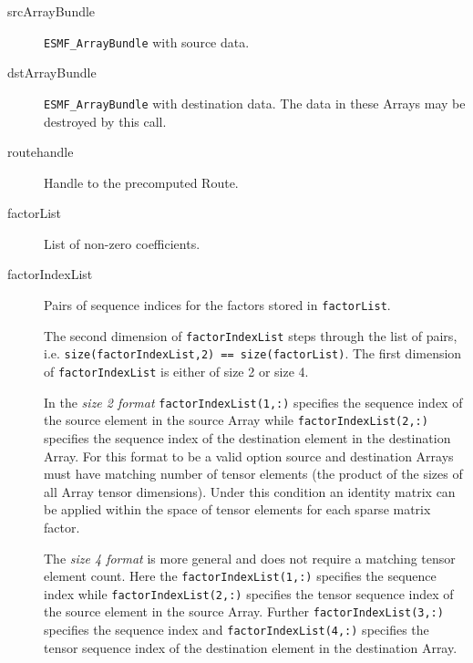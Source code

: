      \begin{description}
     \item [srcArrayBundle]
       {\tt ESMF\_ArrayBundle} with source data.
     \item [dstArrayBundle]
       {\tt ESMF\_ArrayBundle} with destination data. The data in these Arrays
       may be destroyed by this call.
     \item [routehandle]
       Handle to the precomputed Route.
     \item [factorList]
       List of non-zero coefficients.
     \item [factorIndexList]
       Pairs of sequence indices for the factors stored in {\tt factorList}.
  
       \begin{sloppypar}
       The second dimension of {\tt factorIndexList} steps through the list of
       pairs, i.e. {\tt size(factorIndexList,2) == size(factorList)}. The first
       dimension of {\tt factorIndexList} is either of size 2 or size 4.
       \end{sloppypar}
  
       In the {\em size 2 format} {\tt factorIndexList(1,:)} specifies the
       sequence index of the source element in the source Array while
       {\tt factorIndexList(2,:)} specifies the sequence index of the
       destination element in the destination Array. For this format to be a
       valid option source and destination Arrays must have matching number of
       tensor elements (the product of the sizes of all Array tensor dimensions).
       Under this condition an identity matrix can be applied within the space of
       tensor elements for each sparse matrix factor.
  
       \begin{sloppypar}
       The {\em size 4 format} is more general and does not require a matching
       tensor element count. Here the {\tt factorIndexList(1,:)} specifies the
       sequence index while {\tt factorIndexList(2,:)} specifies the tensor
       sequence index of the source element in the source Array. Further
       {\tt factorIndexList(3,:)} specifies the sequence index and
       {\tt factorIndexList(4,:)} specifies the tensor sequence index of the 
       destination element in the destination Array.
       \end{sloppypar}
  

\end{description}
